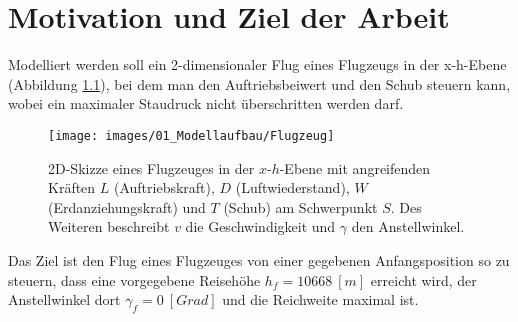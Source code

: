 \chapter{Motivation und Ziel der Arbeit}
Modelliert werden soll ein 2-dimensionaler Flug eines Flugzeugs in der x-h-Ebene (Abbildung \ref{img:Flugzeug}), bei dem man den Auftriebsbeiwert und den Schub steuern kann, wobei ein maximaler Staudruck nicht überschritten werden darf.

\begin{figure}[H]
\begin{center}
\texttt{[image: images/01\_Modellaufbau/Flugzeug]}
\caption{2D-Skizze eines Flugzeuges in der $x$-$h$-Ebene mit angreifenden Kräften $L$ (Auftriebskraft), $D$ (Luftwiederstand), $W$ (Erdanziehungskraft) und $T$ (Schub) am Schwerpunkt $S$. Des Weiteren beschreibt $v$ die Geschwindigkeit und $\gamma$ den Anstellwinkel.}\label{img:Flugzeug}
\end{center}
\end{figure}

Das Ziel ist den Flug eines Flugzeuges von einer gegebenen Anfangsposition so zu steuern, dass eine vorgegebene Reisehöhe $h_f = 10668 \ [m]$ erreicht wird, der Anstellwinkel dort $\gamma_f = 0 \ [Grad]$ und die Reichweite maximal ist.
